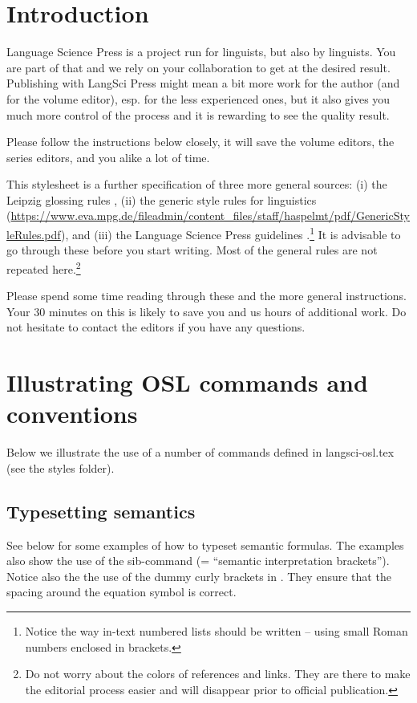 \section{Introduction}\label{sim:sec:intro}

Language Science Press is a project run for linguists, but also by linguists. You are part of that and we rely on your collaboration to get at the desired result. Publishing with LangSci Press might mean a bit more work for the author (and for the volume editor), esp. for the less experienced ones, but it also gives you much more control of the process and it is rewarding to see the quality result.

Please follow the instructions below closely, it will save the volume editors, the series editors, and you alike a lot of time.

\sloppy This stylesheet is a further specification of three more general sources: (i) the Leipzig glossing rules \citep{Bickel.etal2015}, (ii) the generic style rules for linguistics (\url{https://www.eva.mpg.de/fileadmin/content_files/staff/haspelmt/pdf/GenericStyleRules.pdf}), and (iii) the Language Science Press guidelines \citep{Nordhoff.Muller2020}.\footnote{Notice the way in-text numbered lists should be written -- using small Roman numbers enclosed in brackets.} It is advisable to go through these before you start writing. Most of the general rules are not repeated here.\footnote{Do not worry about the colors of references and links. They are there to make the editorial process easier and will disappear prior to official publication.}

Please spend some time reading through these and the more general instructions. Your 30 minutes on this is likely to save you and us hours of additional work. Do not hesitate to contact the editors if you have any questions.

\section{Illustrating OSL commands and conventions}\label{sim:sec:osl-comm}

Below we illustrate the use of a number of commands defined in langsci-osl.tex (see the styles folder).

\subsection{Typesetting semantics}\label{sim:sec:sem}

See below for some examples of how to typeset semantic formulas. The examples also show the use of the sib-command (= ``semantic interpretation brackets''). Notice also the the use of the dummy curly brackets in . They ensure that the spacing around the equation symbol is correct. 

